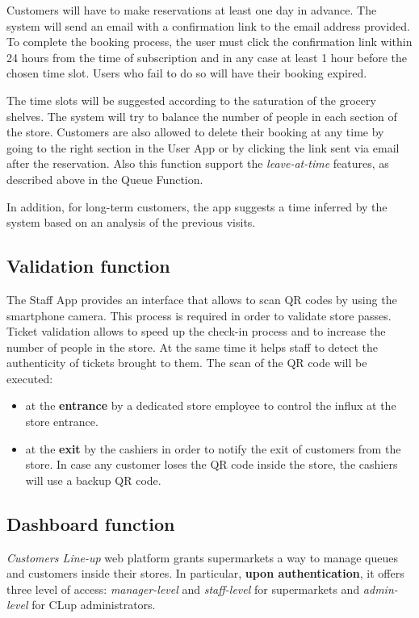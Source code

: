 	Customers will have to make reservations at least one day in advance.\newline
	The system will send an email with a confirmation link to the email address provided. To complete the booking process, the user must click the confirmation link within 24 hours from the time of subscription and in any case at least 1 hour before the chosen time slot. Users who fail to do so will have their booking expired.

	The time slots will be suggested according to the saturation of the grocery shelves. The system will try to balance the number of people in each section of the store.\newline
	Customers are also allowed to delete their booking at any time by going to the right section in the User App or by clicking the link sent via email after the reservation.
	Also this function support the \textit{leave-at-time} features, as described above in the Queue Function.

	In addition, for long-term customers, the app suggests a time inferred by the system based on an analysis of the previous visits.

\subsection{Validation function}
The Staff App provides an interface that allows to scan QR codes by using the smartphone camera. This process is required in order to validate store passes.\newline
Ticket validation allows to speed up the check-in process and to increase the number of people in the store. At the same time it helps staff to detect the authenticity of tickets brought to them.\newline
The scan of the QR code will be executed:
\begin{itemize}
	\item at the \textbf{entrance} by a dedicated store employee to control the influx at the store entrance.
	\item at the \textbf{exit} by the cashiers in order to notify the exit of customers from the store. In case any customer loses the QR code inside the store, the cashiers will use a backup QR code.
\end{itemize}

\subsection{Dashboard function}
\textit{Customers Line-up} web platform grants supermarkets a way to manage queues and customers inside their stores. In particular, \textbf{upon authentication}, it offers three level of access: \textit{manager-level} and \textit{staff-level} for supermarkets and \textit{admin-level} for CLup administrators.

